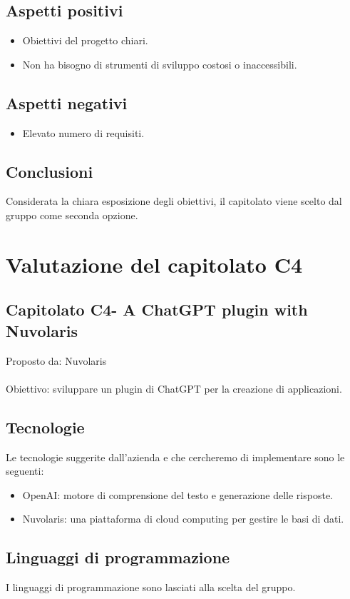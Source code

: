 \documentclass{article}
\begin{document}
\subsection{Aspetti positivi}
\begin{itemize}
    \item Obiettivi del progetto chiari.
    \item Non ha bisogno di strumenti di sviluppo costosi o inaccessibili.
\end{itemize}
\subsection{Aspetti negativi}
\begin{itemize}
    \item Elevato numero di requisiti.
\end{itemize}
\subsection{Conclusioni}
Considerata la chiara esposizione degli obiettivi, il capitolato viene scelto dal gruppo come seconda opzione.

\section{Valutazione del capitolato C4}

\subsection{Capitolato C4- A ChatGPT plugin with Nuvolaris}
Proposto da: Nuvolaris\\ \\
Obiettivo: sviluppare un plugin di ChatGPT per la creazione di applicazioni.
\subsection{Tecnologie}
Le tecnologie suggerite dall’azienda e che cercheremo di implementare sono le seguenti:
\begin{itemize}
    \item OpenAI: motore di comprensione del testo e generazione delle risposte.
    \item Nuvolaris: una piattaforma di cloud computing per gestire le basi di dati.
\end{itemize}
\subsection{Linguaggi di programmazione}
I linguaggi di programmazione sono lasciati alla scelta del gruppo.
\end{document}
